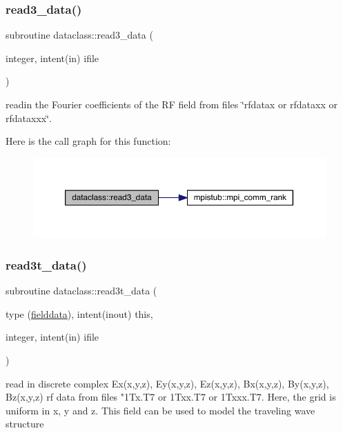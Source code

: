 \subsubsection{\texorpdfstring{read3\_data()}{read3\_data()}}
{\footnotesize\ttfamily subroutine dataclass\+::read3\+\_\+data (\begin{DoxyParamCaption}\item[{integer, intent(in)}]{ifile }\end{DoxyParamCaption})}



readin the Fourier coefficients of the RF field from files \char`\"{}rfdatax or rfdataxx or rfdataxxx\char`\"{}. 

Here is the call graph for this function\+:\nopagebreak
\begin{figure}[H]
\begin{center}
\leavevmode
\includegraphics[width=350pt]{namespacedataclass_a39afae6095340e01362de7d4876aee60_cgraph}
\end{center}
\end{figure}
\mbox{\label{namespacedataclass_a44430d1d47a985d35f3544c9b7dac562}} 
\subsubsection{\texorpdfstring{read3t\_data()}{read3t\_data()}}
{\footnotesize\ttfamily subroutine dataclass\+::read3t\+\_\+data (\begin{DoxyParamCaption}\item[{type (\mbox{\hyperlink{namespacedataclass_structdataclass_1_1fielddata}{fielddata}}), intent(inout)}]{this,  }\item[{integer, intent(in)}]{ifile }\end{DoxyParamCaption})}



read in discrete complex Ex(x,y,z), Ey(x,y,z), Ez(x,y,z), Bx(x,y,z), By(x,y,z), Bz(x,y,z) rf data from files "1\+Tx.\+T7 or 1\+Txx.\+T7 or 1\+Txxx.\+T7. Here, the grid is uniform in x, y and z. This field can be used to model the traveling wave structure 


